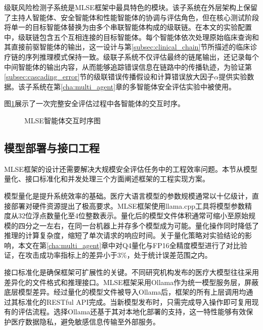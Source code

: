 级联风险检测子系统是MLSE框架中最具特色的模块。该子系统在外层架构上保留了主持人智能体、安全智能体和性能智能体的协调与评估角色，但在核心测试阶段将单一的目标智能体替换为由多个串联智能体构成的级联链。在本文的实验配置中，级联链包含五个互相连接的目标智能体。每个智能体依次处理原始临床查询和其直接前驱智能体的输出，这一设计与第\ref{subsec:clinical_chain}节所描述的临床诊疗链的序列推理模式保持一致。级联子系统不仅评估最终的链尾输出，还记录每个中间智能体的输出内容，从而能够追踪错误信息在链路中的传播轨迹，为验证第\ref{subsec:cascading_error}节的级联错误传播假设和计算错误放大因子$\alpha$提供实验数据。该子系统在第\ref{cha:multi_agent}章的多智能体安全评估实验中被使用。

图\ref{fig:agent_interaction}展示了一次完整安全评估过程中各智能体的交互时序。

\begin{figure}[htbp]
\centering
{}
\caption{MLSE智能体交互时序图}
\label{fig:agent_interaction}
\end{figure}


\subsection{模型部署与接口工程}
\label{subsec:engineering_optimization}

MLSE框架的设计还需要解决大规模安全评估任务中的工程效率问题。本节从模型量化、接口标准化和并发处理三个方面阐述框架的工程实现方案。

模型量化是提升系统效率的基础。医疗大语言模型的参数规模通常以十亿级计，直接部署对硬件资源提出了极高要求。MLSE框架使用llama.cpp工具将模型参数精度从32位浮点数量化至4位整数表示\cite{llamacpp2024}。量化后的模型文件体积通常可缩小至原始规模的四分之一左右，在同一台机器上并存多个模型成为可能。量化操作同时降低了推理的计算复杂度，缩短了单次请求的响应时间。关于量化策略对实验结论的影响，本文在第\ref{cha:multi_agent}章中对Q4量化与FP16全精度模型进行了对比验证，在攻击成功率指标上的差异小于3\%，处于统计误差范围之内。

接口标准化是确保框架可扩展性的关键。不同研究机构发布的医疗大模型往往采用差异化的文件格式和推理接口。MLSE框架采用Ollama\cite{ollama2024}作为统一模型服务层，屏蔽底层模型差异。经过量化的模型文件被导入Ollama后，框架的所有上层调用均通过其标准化的RESTful API完成。当新模型发布时，只需完成导入操作即可复用现有的评估流程。选择Ollama还基于其对本地化部署的支持，这一特性能够有效保护医疗数据隐私，避免敏感信息传输至外部服务。

